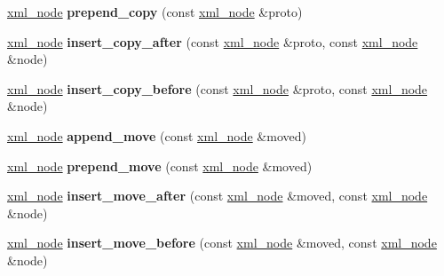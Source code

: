 \begin{DoxyCompactItemize}
\item 
\hypertarget{classpugi_1_1xml__node_a29cc787ee2270e3a71e1d511164621e6}{\hyperlink{classpugi_1_1xml__node}{xml\+\_\+node} {\bfseries prepend\+\_\+copy} (const \hyperlink{classpugi_1_1xml__node}{xml\+\_\+node} \&proto)}\label{classpugi_1_1xml__node_a29cc787ee2270e3a71e1d511164621e6}

\item 
\hypertarget{classpugi_1_1xml__node_a106a600eac7d08608f797d034b331fa8}{\hyperlink{classpugi_1_1xml__node}{xml\+\_\+node} {\bfseries insert\+\_\+copy\+\_\+after} (const \hyperlink{classpugi_1_1xml__node}{xml\+\_\+node} \&proto, const \hyperlink{classpugi_1_1xml__node}{xml\+\_\+node} \&node)}\label{classpugi_1_1xml__node_a106a600eac7d08608f797d034b331fa8}

\item 
\hypertarget{classpugi_1_1xml__node_a21134448747e00888df7ecfb174032d3}{\hyperlink{classpugi_1_1xml__node}{xml\+\_\+node} {\bfseries insert\+\_\+copy\+\_\+before} (const \hyperlink{classpugi_1_1xml__node}{xml\+\_\+node} \&proto, const \hyperlink{classpugi_1_1xml__node}{xml\+\_\+node} \&node)}\label{classpugi_1_1xml__node_a21134448747e00888df7ecfb174032d3}

\item 
\hypertarget{classpugi_1_1xml__node_a25af08bf4e45d2b0380328a0d9d08960}{\hyperlink{classpugi_1_1xml__node}{xml\+\_\+node} {\bfseries append\+\_\+move} (const \hyperlink{classpugi_1_1xml__node}{xml\+\_\+node} \&moved)}\label{classpugi_1_1xml__node_a25af08bf4e45d2b0380328a0d9d08960}

\item 
\hypertarget{classpugi_1_1xml__node_a400191f234f22efd0379e68700bf9650}{\hyperlink{classpugi_1_1xml__node}{xml\+\_\+node} {\bfseries prepend\+\_\+move} (const \hyperlink{classpugi_1_1xml__node}{xml\+\_\+node} \&moved)}\label{classpugi_1_1xml__node_a400191f234f22efd0379e68700bf9650}

\item 
\hypertarget{classpugi_1_1xml__node_a23ad17b7d7539169537d95f1fd1ec9b1}{\hyperlink{classpugi_1_1xml__node}{xml\+\_\+node} {\bfseries insert\+\_\+move\+\_\+after} (const \hyperlink{classpugi_1_1xml__node}{xml\+\_\+node} \&moved, const \hyperlink{classpugi_1_1xml__node}{xml\+\_\+node} \&node)}\label{classpugi_1_1xml__node_a23ad17b7d7539169537d95f1fd1ec9b1}

\item 
\hypertarget{classpugi_1_1xml__node_abf67ad284bfbdf8bc401e24b086cf45e}{\hyperlink{classpugi_1_1xml__node}{xml\+\_\+node} {\bfseries insert\+\_\+move\+\_\+before} (const \hyperlink{classpugi_1_1xml__node}{xml\+\_\+node} \&moved, const \hyperlink{classpugi_1_1xml__node}{xml\+\_\+node} \&node)}\label{classpugi_1_1xml__node_abf67ad284bfbdf8bc401e24b086cf45e}


\end{DoxyCompactItemize}
